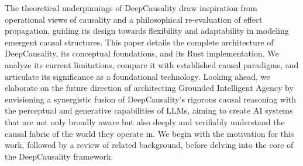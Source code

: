 The theoretical underpinnings of DeepCausality draw inspiration from operational views of causality and a philosophical re-evaluation of effect propagation, guiding its design towards flexibility and adaptability in modeling emergent causal structures. This paper details the complete architecture of DeepCausality, its conceptual foundations, and its Rust implementation. We analyze its current limitations, compare it with established causal paradigms, and articulate its significance as a foundational technology. Looking ahead, we elaborate on the future direction of architecting Grounded Intelligent Agency by envisioning a synergistic fusion of DeepCausality’s rigorous causal reasoning with the perceptual and generative capabilities of LLMs, aiming to create AI systems that are not only broadly aware but also deeply and verifiably understand the causal fabric of the world they operate in. We begin with the motivation for this work, followed by a review of related background, before delving into the core of the DeepCausality framework.

\newpage